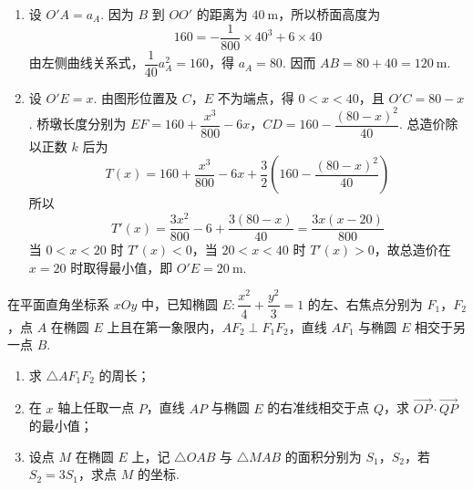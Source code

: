 \begin{solution}
\begin{enumerate}
\item 设 \(O'A=a_A\). 因为 \(B\) 到 \(OO'\) 的距离为 \(40\mathrm{~m}\)，所以桥面高度为
\[
160=-\dfrac{1}{800}\times40^3+6\times40
\]
由左侧曲线关系式，\(\dfrac1{40}a_A^2=160\)，得 \(a_A=80\). 因而 \(AB=80+40=120\ \mathrm{m}\).
\item 设 \(O'E=x\). 由图形位置及 \(C\)，\(E\) 不为端点，得 \(0<x<40\)，且 \(O'C=80-x\). 桥墩长度分别为
\(EF=160+\dfrac{x^3}{800}-6x\)，\(CD=160-\dfrac{(80-x)^2}{40}\).
总造价除以正数 \(k\) 后为
\[
T(x)=160+\dfrac{x^3}{800}-6x+\dfrac32\left(160-\dfrac{(80-x)^2}{40}\right)
\]
所以
\[
T'(x)=\dfrac{3x^2}{800}-6+\dfrac{3(80-x)}{40}=\dfrac{3x(x-20)}{800}
\]
当 \(0<x<20\) 时 \(T'(x)<0\)，当 \(20<x<40\) 时 \(T'(x)>0\)，故总造价在 \(x=20\) 时取得最小值，即 \(O'E=20\ \mathrm{m}\).
\end{enumerate}
\end{solution}

\begin{problem}
在平面直角坐标系 \(xOy\) 中，已知椭圆 \(E:\dfrac{x^2}{4}+\dfrac{y^2}{3}=1\) 的左、右焦点分别为 \(F_1\)，\(F_2\)，点 \(A\) 在椭圆 \(E\) 上且在第一象限内，\(AF_2\perp F_1F_2\)，直线 \(AF_1\) 与椭圆 \(E\) 相交于另一点 \(B\).

\begin{enumerate}
\item 求 \(\triangle AF_1F_2\) 的周长；
\item 在 \(x\) 轴上任取一点 \(P\)，直线 \(AP\) 与椭圆 \(E\) 的右准线相交于点 \(Q\)，求 \(\overrightarrow{OP}\cdot\overrightarrow{QP}\) 的最小值；
\item 设点 \(M\) 在椭圆 \(E\) 上，记 \(\triangle OAB\) 与 \(\triangle MAB\) 的面积分别为 \(S_1\)，\(S_2\)，若 \(S_2=3S_1\)，求点 \(M\) 的坐标.
\end{enumerate}

\end{problem}

